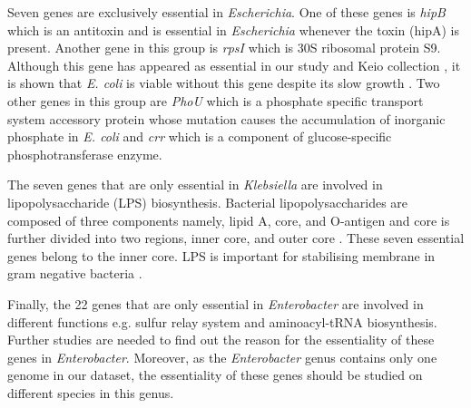 \documentclass[12pt,letterpaper]{article}
\begin{document}
Seven genes are exclusively essential in \textit{Escherichia}. One of these genes is \textit{hipB} which is an antitoxin and is essential in \textit{Escherichia} whenever the toxin (hipA) is present. Another gene in this group is \textit{rpsI} which is 30S ribosomal protein S9. Although this gene has appeared as essential in our study and Keio collection \cite{baba_construction_2006}, it is shown that \textit{E. coli} is viable without this gene despite its slow growth \cite{bubunenko_essentiality_2007, shoji_systematic_2011}. Two other genes in this group are \textit{PhoU} which is a phosphate specific transport system accessory protein whose mutation causes the accumulation of inorganic phosphate in \textit{E. coli} \cite{morohoshi_accumulation_2002} and \textit{crr} which is a component of glucose-specific phosphotransferase enzyme.

The seven genes that are only essential in \textit{Klebsiella} are involved in lipopolysaccharide (LPS) biosynthesis. Bacterial lipopolysaccharides are composed of three components namely, lipid A, core, and O-antigen and core is further divided into two regions, inner core, and outer core \cite{caroff_structure_2003}. These seven essential genes belong to the inner core. LPS is important for stabilising membrane in gram negative bacteria \cite{salton_structure_1996}.
 
Finally, the 22 genes that are only essential in \textit{Enterobacter} are involved in different functions e.g. sulfur relay system and aminoacyl-tRNA biosynthesis. Further studies are needed to find out the reason for the essentiality of these genes in \textit{Enterobacter}. Moreover, as the \textit{Enterobacter} genus contains only one genome in our dataset, the essentiality of these genes should be studied on different species in this genus.
\end{document}
